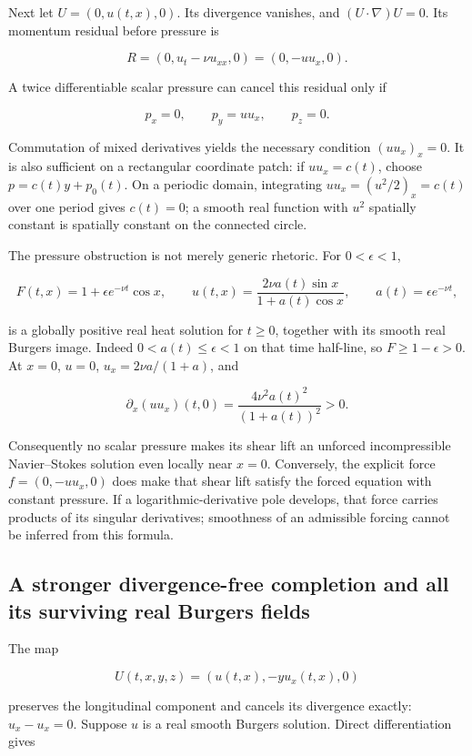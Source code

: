 Next let \(U=(0,u(t,x),0)\). Its divergence vanishes, and \((U \cdot \nabla)U=0\). Its momentum residual before pressure is

\[
R=(0,u_t-\nu u_{xx},0)=(0,-uu_x,0).
\]

A twice differentiable scalar pressure can cancel this residual only if

\[
p_x=0,\qquad p_y=uu_x,\qquad p_z=0.
\]

Commutation of mixed derivatives yields the necessary condition \((u u_x)_x=0\). It is also sufficient on a rectangular coordinate patch: if \(u u_x=c(t)\), choose \(p=c(t)y+p_0(t)\). On a periodic domain, integrating \(u u_x=(u^2/2)_x=c(t)\) over one period gives \(c(t)=0\); a smooth real function with \(u^2\) spatially constant is spatially constant on the connected circle.

The pressure obstruction is not merely generic rhetoric. For \(0<\epsilon<1\),

\[
F(t,x)=1+\epsilon e^{-\nu t}\cos x,
\qquad
u(t,x)=\frac{2\nu a(t)\sin x}{1+a(t)\cos x},
\qquad a(t)=\epsilon e^{-\nu t},
\]

is a globally positive real heat solution for \(t\ge0\), together with its smooth real Burgers image. Indeed \(0<a(t)\le\epsilon<1\) on that time half-line, so \(F\ge1-\epsilon>0\). At \(x=0\), \(u=0\), \(u_x=2 \nu a/(1+a)\), and

\[
\partial_x(uu_x)(t,0)=\frac{4\nu^2a(t)^2}{(1+a(t))^2}>0.
\]

Consequently no scalar pressure makes its shear lift an unforced incompressible Navier--Stokes solution even locally near \(x=0\). Conversely, the explicit force \(f=(0,-u u_x,0)\) does make that shear lift satisfy the forced equation with constant pressure. If a logarithmic-derivative pole develops, that force carries products of its singular derivatives; smoothness of an admissible forcing cannot be inferred from this formula.

\subsection{A stronger divergence-free completion and all its surviving real Burgers fields}\label{a-stronger-divergence-free-completion-and-all-its-surviving-real-burgers-fields}

The map

\[
U(t,x,y,z)=(u(t,x),-y u_x(t,x),0)
\]

preserves the longitudinal component and cancels its divergence exactly: \(u_x-u_x=0\). Suppose \(u\) is a real smooth Burgers solution. Direct differentiation gives

